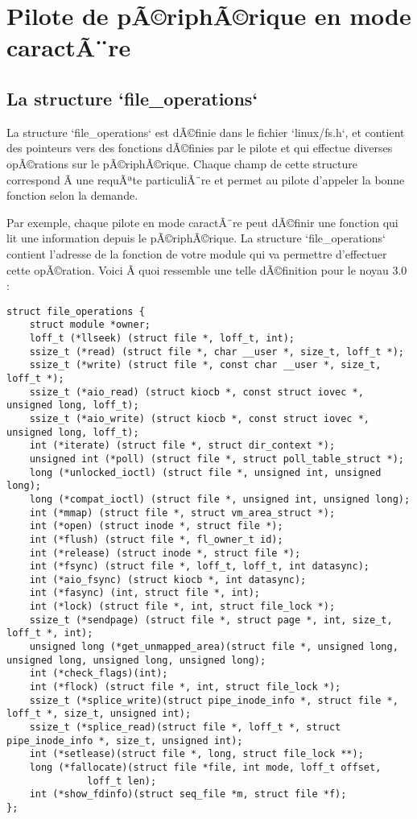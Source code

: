 \documentclass[11pt]{article}
\begin{document}
\section*{Pilote de pÃ©riphÃ©rique en mode caractÃ¨re}
\label{sec-6}

\subsection*{La structure `file\_operations`}
\label{sec-6-1}

La structure `file\_operations` est dÃ©finie dans le fichier `linux/fs.h`, et contient des pointeurs vers des fonctions dÃ©finies par le pilote et qui effectue diverses opÃ©rations sur le pÃ©riphÃ©rique. Chaque champ de cette structure correspond Ã  une requÃªte particuliÃ¨re et permet au pilote d'appeler la bonne fonction selon la demande.

Par exemple, chaque pilote en mode caractÃ¨re peut dÃ©finir une fonction qui lit une information depuis le pÃ©riphÃ©rique. La structure `file\_operations` contient l'adresse de la fonction de votre module qui va permettre d'effectuer cette opÃ©ration. Voici Ã  quoi ressemble une telle dÃ©finition pour le noyau 3.0 :

\begin{verbatim}
struct file_operations {
    struct module *owner;
    loff_t (*llseek) (struct file *, loff_t, int);
    ssize_t (*read) (struct file *, char __user *, size_t, loff_t *);
    ssize_t (*write) (struct file *, const char __user *, size_t, loff_t *);
    ssize_t (*aio_read) (struct kiocb *, const struct iovec *, unsigned long, loff_t);
    ssize_t (*aio_write) (struct kiocb *, const struct iovec *, unsigned long, loff_t);
    int (*iterate) (struct file *, struct dir_context *);
    unsigned int (*poll) (struct file *, struct poll_table_struct *);
    long (*unlocked_ioctl) (struct file *, unsigned int, unsigned long);
    long (*compat_ioctl) (struct file *, unsigned int, unsigned long);
    int (*mmap) (struct file *, struct vm_area_struct *);
    int (*open) (struct inode *, struct file *);
    int (*flush) (struct file *, fl_owner_t id);
    int (*release) (struct inode *, struct file *);
    int (*fsync) (struct file *, loff_t, loff_t, int datasync);
    int (*aio_fsync) (struct kiocb *, int datasync);
    int (*fasync) (int, struct file *, int);
    int (*lock) (struct file *, int, struct file_lock *);
    ssize_t (*sendpage) (struct file *, struct page *, int, size_t, loff_t *, int);
    unsigned long (*get_unmapped_area)(struct file *, unsigned long, unsigned long, unsigned long, unsigned long);
    int (*check_flags)(int);
    int (*flock) (struct file *, int, struct file_lock *);
    ssize_t (*splice_write)(struct pipe_inode_info *, struct file *, loff_t *, size_t, unsigned int);
    ssize_t (*splice_read)(struct file *, loff_t *, struct pipe_inode_info *, size_t, unsigned int);
    int (*setlease)(struct file *, long, struct file_lock **);
    long (*fallocate)(struct file *file, int mode, loff_t offset,
              loff_t len);
    int (*show_fdinfo)(struct seq_file *m, struct file *f);
};
\end{verbatim}
\end{document}
